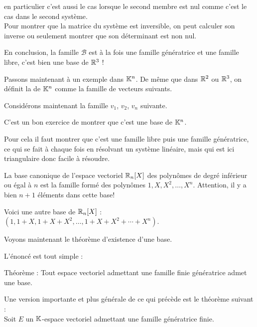 \change
en particulier c'est aussi le cas lorsque le second membre est nul 
comme c'est le cas dans le second système.\\
  
Pour montrer que la matrice du système est inversible, 
on peut calculer son inverse ou seulement montrer que son déterminant est non nul. 

\change
En conclusion, la famille $\mathcal{B}$ est à la fois une famille génératrice 
et une famille libre, c'est bien une base de $\mathbb{R}^3$ !


\diapo
Passons maintenant à un exemple dans $\mathbb{K}^n$. 
De m\^eme que dans $\mathbb{R}^2$ ou $\mathbb{R}^3$, on définit la  
de $\mathbb{K}^n$ comme la famille de vecteurs suivants.

\change
Considérons maintenant la famille $v_1$, $v_2$, $v_n$ suivante. 

C'est un bon exercice de montrer que c'est une base de $\mathbb{K}^n$. 

Pour cela il faut montrer que c'est une famille libre puis une famille génératrice,
ce qui se fait à chaque fois en résolvant un système linéaire, 
mais qui est ici triangulaire donc facile à résoudre.





\diapo
La base canonique de l'espace vectoriel $\mathbb{R}_n[X]$ des polynômes 
de degré inférieur ou égal à $n$ est la famille formé des polynômes $1,X,X^2, \ldots , X^n$. 
  Attention, il y a bien $n+1$ éléments dans cette base!
  
\change
Voici une autre base de $\mathbb{R}_n[X]$ :
  $(1,1+X,1+X+X^2,\ldots,1+X+X^2+\cdots+X^n)$.
  
\diapo
Voyons maintenant le théorème d'existence d'une base. 

L'énoncé est tout simple :

Théorème :  Tout espace vectoriel admettant une famille finie génératrice
admet une base.



\diapo
Une version importante et plus générale de ce qui précède est le théorème suivant :\\

Soit $E$ un $\mathbb{K}$-espace vectoriel admettant une famille génératrice finie.\\

